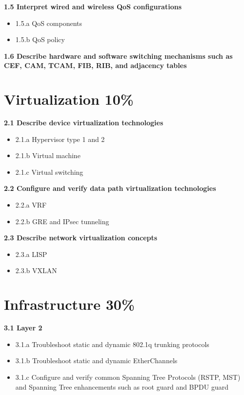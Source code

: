 \documentclass{article}
\begin{document}
\noindent\textbf{1.5 Interpret wired and wireless QoS configurations}
\begin{itemize}
\item 1.5.a QoS components
\item 1.5.b QoS policy
\end{itemize}

\noindent\textbf{1.6 Describe hardware and software switching mechanisms such as CEF, CAM, TCAM, FIB, RIB, and adjacency tables}\\

\newpage
\section{Virtualization 10\%}
\textbf{2.1 Describe device virtualization technologies}
\begin{itemize}
\item 2.1.a Hypervisor type 1 and 2
\item 2.1.b Virtual machine
\item 2.1.c Virtual switching
\end{itemize}

\noindent\textbf{2.2 Configure and verify data path virtualization technologies}
\begin{itemize}
\item 2.2.a VRF
\item 2.2.b GRE and IPsec tunneling
\end{itemize}

\noindent\textbf{2.3 Describe network virtualization concepts}
\begin{itemize}
\item 2.3.a LISP
\item 2.3.b VXLAN
\end{itemize}

\newpage
\section{Infrastructure 30\%}
\textbf{3.1 Layer 2}
\begin{itemize}
\item 3.1.a Troubleshoot static and dynamic 802.1q trunking protocols
\item 3.1.b Troubleshoot static and dynamic EtherChannels
\item 3.1.c Configure and verify common Spanning Tree Protocols (RSTP, MST) and Spanning Tree enhancements such as root guard and BPDU guard
\end{itemize}
\end{document}
